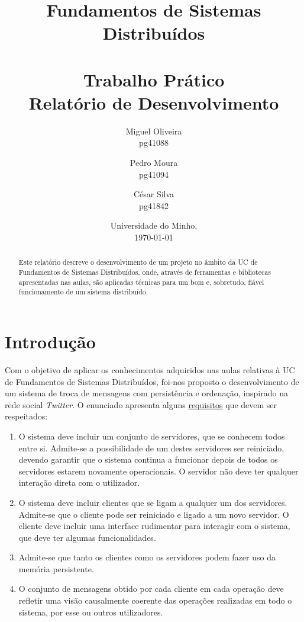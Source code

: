 \documentclass[12pt, a4paper]{report}
\begin{document}
\title{
    Fundamentos de Sistemas Distribuídos\\
    \textbf{\\Trabalho Prático}
    \large{\\Relatório de Desenvolvimento}
}

\author{
    Miguel Oliveira\\ pg41088
    \and Pedro Moura\\ pg41094
    \and César Silva\\ pg41842
}
\date{Universidade do Minho,\\\today}

\maketitle

\begin{abstract}
    Este relatório descreve o desenvolvimento de um projeto no âmbito da UC de Fundamentos de Sistemas Distribuídos, onde, através de ferramentas e bibliotecas apresentadas nas aulas, são aplicadas técnicas para um bom e, sobretudo, fiável funcionamento de um sistema distribuído.
\end{abstract}

\tableofcontents

\chapter{Introdução}
Com o objetivo de aplicar os conhecimentos adquiridos nas aulas relativas à UC de Fundamentos de Sistemas Distribuídos, foi-nos proposto o desenvolvimento de um sistema de troca de mensagens com persistência e ordenação, inspirado na rede social \textit{Twitter}.
O enunciado apresenta alguns \underline{requisitos} que devem ser respeitados:
\begin{enumerate}
    \item O sistema deve incluir um conjunto de servidores, que se conhecem todos entre si. Admite-se a possibilidade de um destes servidores ser reiniciado, devendo garantir que o sistema continua a funcionar depois de todos os servidores estarem novamente operacionais. O servidor não deve ter qualquer interação direta com o utilizador.
    \item O sistema deve incluir clientes que se ligam a qualquer um dos servidores. Admite-se que o cliente pode ser reiniciado e ligado a um novo servidor. O cliente deve incluir uma interface rudimentar para interagir com o sistema, que deve ter algumas funcionalidades.
    \item Admite-se que tanto os clientes como os servidores podem fazer uso da memória persistente.
    \item O conjunto de mensagens obtido por cada cliente em cada operação deve refletir uma visão causalmente coerente das operações realizadas em todo o sistema, por esse ou outros utilizadores.
\end{enumerate}
\end{document}
